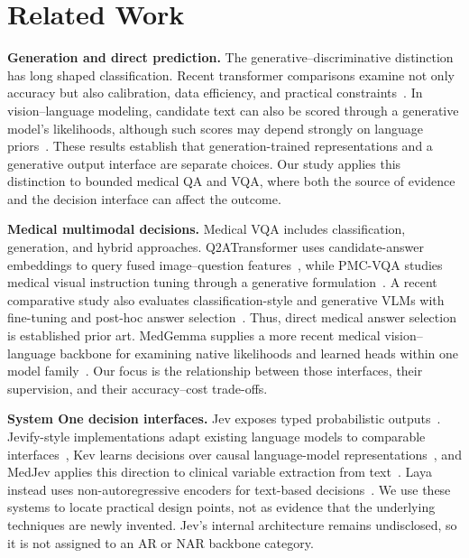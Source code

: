 
\section{Related Work}
\label{sec:related}

\textbf{Generation and direct prediction.} The generative--discriminative distinction has long shaped classification. Recent transformer comparisons examine not only accuracy but also calibration, data efficiency, and practical constraints~\cite{kasa}. In vision--language modeling, candidate text can also be scored through a generative model's likelihoods, although such scores may depend strongly on language priors~\cite{visualgpt}. These results establish that generation-trained representations and a generative output interface are separate choices. Our study applies this distinction to bounded medical QA and VQA, where both the source of evidence and the decision interface can affect the outcome.

\textbf{Medical multimodal decisions.} Medical VQA includes classification, generation, and hybrid approaches. Q2ATransformer uses candidate-answer embeddings to query fused image--question features~\cite{q2a}, while PMC-VQA studies medical visual instruction tuning through a generative formulation~\cite{pmcvqa}. A recent comparative study also evaluates classification-style and generative VLMs with fine-tuning and post-hoc answer selection~\cite{systematicvqa}. Thus, direct medical answer selection is established prior art. MedGemma supplies a more recent medical vision--language backbone for examining native likelihoods and learned heads within one model family~\cite{medgemma}. Our focus is the relationship between those interfaces, their supervision, and their accuracy--cost trade-offs.

\textbf{System One decision interfaces.} Jev exposes typed probabilistic outputs~\cite{jev}. Jevify-style implementations adapt existing language models to comparable interfaces~\cite{jevify}, Kev learns decisions over causal language-model representations~\cite{kev}, and MedJev applies this direction to clinical variable extraction from text~\cite{medjev}. Laya instead uses non-autoregressive encoders for text-based decisions~\cite{laya}. We use these systems to locate practical design points, not as evidence that the underlying techniques are newly invented. Jev's internal architecture remains undisclosed, so it is not assigned to an AR or NAR backbone category.

